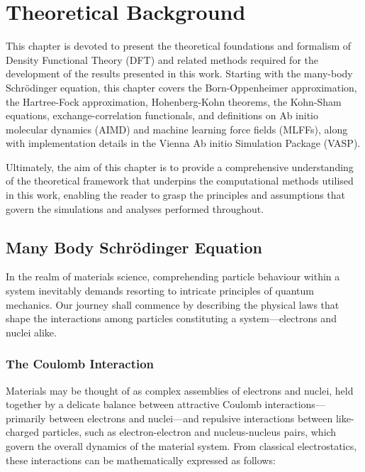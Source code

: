 
\chapter{Theoretical Background} %

\label{Chapter2} %

This chapter is devoted to present the theoretical foundations and formalism of Density Functional Theory (DFT) and related methods required for the development of the results presented in this work. Starting with the many-body Schrödinger equation, this chapter covers the Born-Oppenheimer approximation, the Hartree-Fock approximation, Hohenberg-Kohn theorems, the Kohn-Sham equations, exchange-correlation functionals, and definitions on Ab initio molecular dynamics (AIMD) and machine learning force fields (MLFFs), along with implementation details in the Vienna Ab initio Simulation Package (VASP).

Ultimately, the aim of this chapter is to provide a comprehensive understanding of the theoretical framework that underpins the computational methods utilised in this work, enabling the reader to grasp the principles and assumptions that govern the simulations and analyses performed throughout.

\section{Many Body Schrödinger Equation}
In the realm of materials science, comprehending particle behaviour within a system inevitably demands resorting to intricate principles of quantum mechanics. Our journey shall commence by describing the physical laws that shape the interactions among particles constituting a system---electrons and nuclei alike. 

\subsection{The Coulomb Interaction}

Materials may be thought of as complex assemblies of electrons and nuclei, held together by a delicate balance between attractive Coulomb interactions---primarily between electrons and nuclei---and repulsive interactions between like-charged particles, such as electron-electron and nucleus-nucleus pairs, which govern the overall dynamics of the material system\supercite{giustino2014materials, sholl2023density, kaxiras2003atomic}.  From classical electrostatics, these interactions can be mathematically expressed as follows: 

